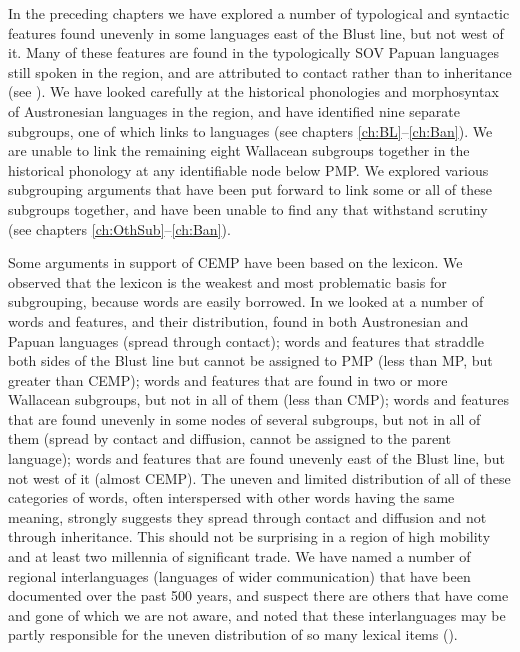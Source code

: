 In the preceding chapters we have explored a number of typological
and syntactic features found unevenly in some languages east
of the Blust line,
but not west of it.
Many of these features are found in the typologically SOV Papuan
languages still spoken in the region,
and are attributed to contact rather than to inheritance (see ).
We have looked carefully at the historical phonologies
and morphosyntax of Austronesian languages in the region,
and have identified nine separate subgroups,
one of which links to  languages (see chapters \ref{ch:BL}--\ref{ch:Ban}).
We are unable to link the remaining eight Wallacean subgroups
together in the historical phonology at any identifiable node below PMP.
We explored various subgrouping arguments that have been put
forward to link some or all of these subgroups together,
and have been unable to find any that withstand scrutiny (see chapters \ref{ch:OthSub}--\ref{ch:Ban}).

Some arguments in support of CEMP have been based on the lexicon.
We observed that the lexicon is the weakest
and most problematic basis for subgrouping,
because words are easily borrowed.
In  we looked at a number of words
and features, and their distribution, found in both Austronesian
and Papuan languages (spread through contact); words
and features that straddle both sides of the Blust line but cannot
be assigned to PMP (less than MP,
but greater than CEMP); words
and features that are found in two or more Wallacean subgroups,
but not in all of them (less than CMP); words
and features that are found unevenly in some nodes of several
subgroups, but not in all of them (spread by contact
and diffusion, cannot be assigned to the parent language); words
and features that are found unevenly east of the Blust line,
but not west of it (almost CEMP).
The uneven and limited distribution of all of these categories
of words, often interspersed with other words having the same meaning,
strongly suggests they spread through contact
and diffusion and not through inheritance.
This should not be surprising in a region of high mobility
and at least two millennia of significant trade.
We have named a number of regional interlanguages (languages
of wider communication) that have been documented over the past
500 years, and suspect there are others that have come
and gone of which we are not aware,
and noted that these interlanguages may be partly responsible
for the uneven distribution of so many lexical items ().

